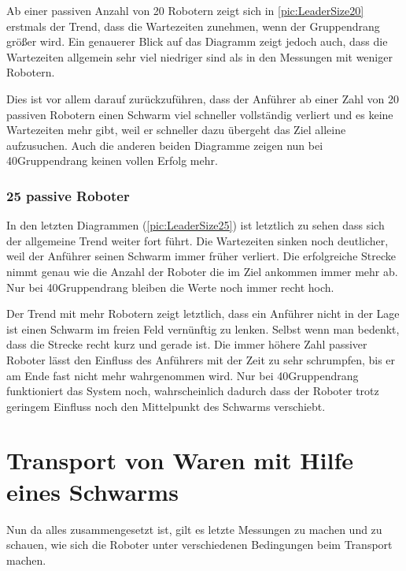 Ab einer passiven Anzahl von 20 Robotern zeigt sich in \autoref{pic:LeaderSize20} erstmals der Trend, dass die Wartezeiten zunehmen, wenn der Gruppendrang größer wird. Ein genauerer Blick auf das Diagramm zeigt jedoch auch, dass die Wartezeiten allgemein sehr viel niedriger sind als in den Messungen mit weniger Robotern.

Dies ist vor allem darauf zurückzuführen, dass der Anführer ab einer Zahl von 20 passiven Robotern einen Schwarm viel schneller vollständig verliert und es keine Wartezeiten mehr gibt, weil er schneller dazu übergeht das Ziel alleine aufzusuchen. Auch die anderen beiden Diagramme zeigen nun bei 40\per Gruppendrang keinen vollen Erfolg mehr.

\subsubsection*{25 passive Roboter}

In den letzten Diagrammen (\autoref{pic:LeaderSize25}) ist letztlich zu sehen dass sich der allgemeine Trend weiter fort führt. Die Wartezeiten sinken noch deutlicher, weil der Anführer seinen Schwarm immer früher verliert. Die erfolgreiche Strecke nimmt genau wie die Anzahl der Roboter die im Ziel ankommen immer mehr ab. Nur bei 40\per Gruppendrang bleiben die Werte noch immer recht hoch.

Der Trend mit mehr Robotern zeigt letztlich, dass ein Anführer nicht in der Lage ist einen Schwarm im freien Feld vernünftig zu lenken. Selbst wenn man bedenkt, dass die Strecke recht kurz und gerade ist. Die immer höhere Zahl passiver Roboter lässt den Einfluss des Anführers mit der Zeit zu sehr schrumpfen, bis er am Ende fast nicht mehr wahrgenommen wird. Nur bei 40\per Gruppendrang funktioniert das System noch, wahrscheinlich dadurch dass der Roboter trotz geringem Einfluss noch den Mittelpunkt des Schwarms verschiebt.








\section{Transport von Waren mit Hilfe eines Schwarms}\label{sec:EvaluationTransport}

Nun da alles zusammengesetzt ist, gilt es letzte Messungen zu machen und zu schauen, wie sich die Roboter unter verschiedenen Bedingungen beim Transport machen.

